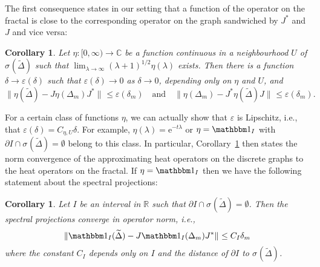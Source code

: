 \documentclass[12pt,reqno,a4paper]{amsart}            %
\numberwithin{equation}{section}
\theoremstyle{mythmstyle}       %
\newtheorem{corollary}[theorem]{Corollary}
\theoremstyle{mydefstyle}        %
\newcommand{\Cor}[1]{Corollary~\ref{cor:#1}}
\newcommand{\normsymb}{\|}
\newcommand{\norm}[2][{}]{\normsymb{#2}\normsymb_{{#1}}}    %
\newcommand{\map}[3]{ #1 \colon #2 \longrightarrow #3}    %
\newcommand{\bd}  {\partial}          %
\newcommand{\specsymb} {\sigma} %
\newcommand{\spec}[2][{}]   {\specsymb_{\mathrm{#1}}(#2)}
\newcommand{\eps}{\varepsilon} %
\newcommand{\R}{\mathbb{R}} %
\newcommand{\C}{\mathbb{C}} %
\newcommand{\1}{\mathbbm 1}                    %
\newcommand{\e}{\mathrm e}  %
\newcommand{\wt}{\widetilde}           %
\newcommand{\quadtext}[1]{\quad\text{#1}\quad}
\begin{document}
The first consequence states in our setting that a function of the
operator on the fractal is close to the corresponding operator on the
graph sandwiched by $J^*$ and $J$ and vice versa:
\begin{corollary}
  \label{cor:main1}
  Let $\map \eta {[0,\infty)} \C$ be a function continuous in a
  neighbourhood $U$ of $\spec {\wt \Delta}$ such that $\lim_{\lambda
    \to \infty} (\lambda+1)^{1/2} \eta(\lambda)$ exists.  Then there
  is a function $\delta \to \eps(\delta)$ such that $\eps(\delta)\to
  0$ as $\delta\to 0$, depending only on $\eta$ and $U$, and
  \begin{equation*}
    \norm{\eta(\wt \Delta) - J \eta(\Delta_m) J^*}
    \le \eps(\delta_m)
    \quadtext{and}
    \norm{\eta(\Delta_m) - J^* \eta(\wt \Delta) J} 
    \le \eps(\delta_m).
  \end{equation*}
\end{corollary}
For a certain class of functions $\eta$, we can actually show that
$\eps$ is Lipschitz, i.e., that $\eps(\delta)=C_{\eta,U} \delta$.  For
example, $\eta(\lambda)=\e^{-t\lambda}$ or $\eta=\1_I$ with $\bd I
\cap \spec {\wt\Delta} = \emptyset$ belong to this class.  In particular,
\Cor{main1} then states the norm convergence of the approximating heat
operators on the discrete graphs to the heat operators on the fractal.
If $\eta=\1_I$ then we have the following statement about the spectral
projections:
\begin{corollary}
  \label{cor:main1a}
  Let $I$ be an interval in $\R$ such that $\bd I \cap \spec {\wt
    \Delta} = \emptyset$.  Then the spectral projections converge in
  operator norm, i.e.,
  \begin{equation*}
    \norm{\1_I(\wt \Delta) - J \1_I(\Delta_m) J^*} \le C_I \delta_m
  \end{equation*}
  where the constant $C_I$ depends only on $I$ and the distance of
  $\bd I$ to $\spec{\wt \Delta}$.
\end{corollary}
\end{document}

